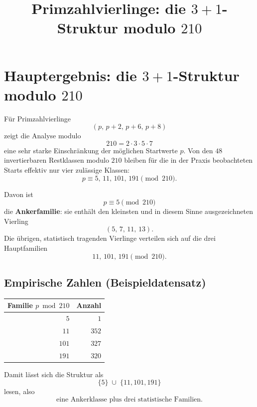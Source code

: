\documentclass[11pt,a4paper]{article}
\title{Primzahlvierlinge: die $3{+}1$-Struktur modulo $210$}
\author{}
\date{}
\begin{document}
\maketitle

\begin{center}
\end{center}

\section{Hauptergebnis: die $3{+}1$-Struktur modulo $210$}

Für Primzahlvierlinge
\[
  (p,\, p+2,\, p+6,\, p+8)
\]
zeigt die Analyse modulo
\[
  210 = 2 \cdot 3 \cdot 5 \cdot 7
\]
eine sehr starke Einschränkung der möglichen Startwerte $p$. Von den $48$ invertierbaren Restklassen modulo $210$ bleiben für die in der Praxis beobachteten Starts effektiv nur vier zulässige Klassen:
\[
  \boxed{p \equiv 5,\, 11,\, 101,\, 191 \pmod{210}.}
\]

Davon ist
\[
  \boxed{p \equiv 5 \pmod{210}}
\]
die \textbf{Ankerfamilie}: sie enthält den kleinsten und in diesem Sinne ausgezeichneten Vierling
\[
  (5,\, 7,\, 11,\, 13).
\]
Die übrigen, statistisch tragenden Vierlinge verteilen sich auf die drei Hauptfamilien
\[
  \boxed{11,\, 101,\, 191 \pmod{210}.}
\]

\subsection*{Empirische Zahlen (Beispieldatensatz)}

\begin{table}[htbp]
  \centering
  \begin{tabular}{@{}rr@{}}
    \toprule
    Familie $p \bmod 210$ & Anzahl \\
    \midrule
    $5$   & $1$ \\
    $11$  & $352$ \\
    $101$ & $327$ \\
    $191$ & $320$ \\
    \bottomrule
  \end{tabular}
\end{table}

Damit lässt sich die Struktur als
\[
  \boxed{\{5\} \;\cup\; \{11, 101, 191\}}
\]
lesen, also
\[
  \boxed{\text{eine Ankerklasse plus drei statistische Familien.}}
\]
\end{document}

